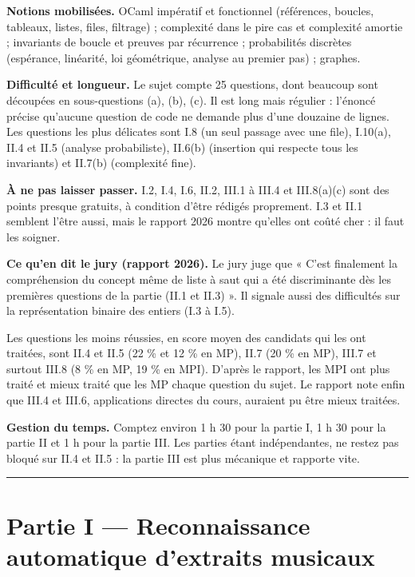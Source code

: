 \documentclass[11pt,a4paper]{article}
\begin{document}
\textbf{Notions mobilisées.} OCaml impératif et fonctionnel (références, boucles, tableaux, listes, files, filtrage) ; complexité dans le pire cas et complexité amortie ; invariants de boucle et preuves par récurrence ; probabilités discrètes (espérance, linéarité, loi géométrique, analyse au premier pas) ; graphes.

\textbf{Difficulté et longueur.} Le sujet compte 25 questions, dont beaucoup sont découpées en sous-questions (a), (b), (c). Il est long mais régulier : l'énoncé précise qu'aucune question de code ne demande plus d'une douzaine de lignes. Les questions les plus délicates sont I.8 (un seul passage avec une file), I.10(a), II.4 et II.5 (analyse probabiliste), II.6(b) (insertion qui respecte tous les invariants) et II.7(b) (complexité fine).

\textbf{À ne pas laisser passer.} I.2, I.4, I.6, II.2, III.1 à III.4 et III.8(a)(c) sont des points presque gratuits, à condition d'être rédigés proprement. I.3 et II.1 semblent l'être aussi, mais le rapport 2026 montre qu'elles ont coûté cher : il faut les soigner.

\textbf{Ce qu'en dit le jury (rapport 2026).} Le jury juge que « C'est finalement la compréhension du concept même de liste à saut qui a été discriminante dès les premières questions de la partie (II.1 et II.3) ». Il signale aussi des difficultés sur la représentation binaire des entiers (I.3 à I.5).

Les questions les moins réussies, en score moyen des candidats qui les ont traitées, sont II.4 et II.5 (22 \% et 12 \% en MP), II.7 (20 \% en MP), III.7 et surtout III.8 (8 \% en MP, 19 \% en MPI). D'après le rapport, les MPI ont plus traité et mieux traité que les MP chaque question du sujet. Le rapport note enfin que III.4 et III.6, applications directes du cours, auraient pu être mieux traitées.

\textbf{Gestion du temps.} Comptez environ 1 h 30 pour la partie I, 1 h 30 pour la partie II et 1 h pour la partie III. Les parties étant indépendantes, ne restez pas bloqué sur II.4 et II.5 : la partie III est plus mécanique et rapporte vite.

\begin{center}\rule{0.5\linewidth}{0.5pt}\end{center}

\hypertarget{partie-i-reconnaissance-automatique-dextraits-musicaux}{%
\section{Partie I --- Reconnaissance automatique d'extraits musicaux}\label{partie-i-reconnaissance-automatique-dextraits-musicaux}}
\end{document}
